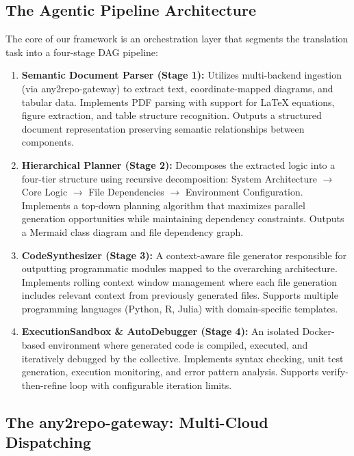\documentclass[10pt]{article}
\begin{document}
\subsection{The Agentic Pipeline Architecture}

The core of our framework is an orchestration layer that segments the translation task into a four-stage DAG pipeline:

\begin{enumerate}
    \item \textbf{Semantic Document Parser (Stage 1):} Utilizes multi-backend ingestion (via any2repo-gateway) to extract text, coordinate-mapped diagrams, and tabular data. Implements PDF parsing with support for LaTeX equations, figure extraction, and table structure recognition. Outputs a structured document representation preserving semantic relationships between components.
    
    \item \textbf{Hierarchical Planner (Stage 2):} Decomposes the extracted logic into a four-tier structure using recursive decomposition: System Architecture $\rightarrow$ Core Logic $\rightarrow$ File Dependencies $\rightarrow$ Environment Configuration. Implements a top-down planning algorithm that maximizes parallel generation opportunities while maintaining dependency constraints. Outputs a Mermaid class diagram and file dependency graph.
    
    \item \textbf{CodeSynthesizer (Stage 3):} A context-aware file generator responsible for outputting programmatic modules mapped to the overarching architecture. Implements rolling context window management where each file generation includes relevant context from previously generated files. Supports multiple programming languages (Python, R, Julia) with domain-specific templates.
    
    \item \textbf{ExecutionSandbox \& AutoDebugger (Stage 4):} An isolated Docker-based environment where generated code is compiled, executed, and iteratively debugged by the collective. Implements syntax checking, unit test generation, execution monitoring, and error pattern analysis. Supports verify-then-refine loop with configurable iteration limits.
\end{enumerate}

\subsection{The any2repo-gateway: Multi-Cloud Dispatching}
\end{document}
